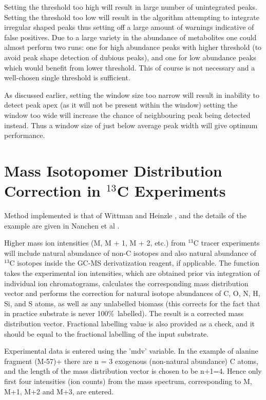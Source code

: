 Setting the threshold too high will result in large number of unintegrated 
peaks. Setting the threshold too low will result in the algorithm attempting 
to integrate irregular shaped peaks thus setting off a large amount of warnings 
indicative of false positives. Due to a large variety in the abundance of 
metabolites one could almost perform two runs: one for high abundance peaks 
with higher threshold (to avoid peak shape detection of dubious peaks), and one 
for low abundance peaks which would benefit from lower threshold. This of course 
is not necessary and a well-chosen single threshold is sufficient. 

As discussed earlier, setting the window size too narrow will result in 
inability to detect peak apex (as it will not be present within the window) 
setting the window too wide will increase the chance of neighbouring peak being 
detected instead. Thus a window size of just below average peak width will give 
optimum performance.

\section{Mass Isotopomer Distribution Correction in $^{13}$C Experiments}


Method implemented is that of Wittman and Heinzle \cite{wittman99}, and the
details of the example are given in Nanchen et al \cite{nanchen07}. 

Higher mass ion intensities (M, M + 1, M + 2, etc.) from $^{13}$C tracer 
experiments will include natural abundance of non-C isotopes and also natural 
abundance of $^{13}$C isotopes inside the GC-MS derivatization reagent, if 
applicable. The function takes the experimental ion intensities, which are
obtained prior via integration of individual ion chromatograms, calculates
the corresponding mass distribution vector and performs the correction for
natural isotope abundances of C, O, N, H, Si, and S atoms, as well as any
unlabelled biomass (this corrects for the fact that in practice substrate
is never 100\%\ labelled). The result is a corrected mass distribution vector.
Fractional labelling value is also provided as a check, and it should be
equal to the fractional labelling of the input substrate.

Experimental data is entered using the 'mdv' variable. In the example of
alanine fragment (M-57)+ \cite{nanchen07} there are n = 3 exogenous (non-natural
abundance) C atoms, and the length of the mass distribution vector
is chosen to be n+1=4. Hence only first four intensities (ion counts)
from the mass spectrum, corresponding to M, M+1, M+2 and M+3, are entered.

